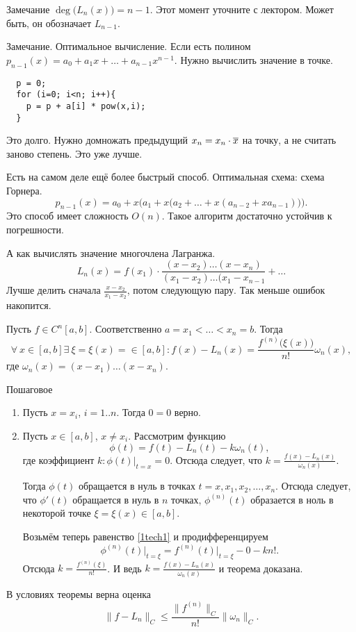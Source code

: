 Замечание $\deg \big(L_n(x)\big) = n-1$. Этот момент уточните с лектором. Может быть, он обозначает $L_{n-1}$.

Замечание. Оптимальное вычисление. Если есть полином $p_{n-1}(x) = a_0 + a_1 x+ \dots + a_{n-1} x^{n-1}$. Нужно вычислить значение в точке.
\begin{verbatim}
  p = 0;
  for (i=0; i<n; i++){
    p = p + a[i] * pow(x,i);
  }
\end{verbatim}
Это долго. Нужно домножать предыдущий $x_n = x_n\cdot \overline{x}$ на точку, а не считать заново степень. Это уже лучше.

Есть на самом деле ещё более быстрый способ. Оптимальная схема: схема Горнера.
\[
  p_{n-1}(x) = a_0 + x\Big(a_1 + x\big(a_2 + \dots + x(a_{n-2} + x a_{n-1})\big)\Big).
\]
Это способ имеет сложность $O(n)$.
Такое алгоритм достаточно устойчив к погрешности.

А как вычислять значение многочлена Лагранжа.
\[
  L_n(x) = f(x_1) \cdot \frac{ (x-x_2)\dots (x-x_n)}{(x_1-x_2)\dots(x_1-x_{n-1}}+\dots
\]
Лучше делить сначала $\frac{x-x_2}{x_1-x_2}$, потом следующую пару. Так меньше ошибок накопится.

\begin{The}
  Пусть $f\in C^n[a,b]$. Соответственно $a=x_1<\dots<x_n=b$. Тогда
\[
  \forall\ x\in[a,b]\exists\ \xi = \xi(x) = \in[a,b]\colon 
  f(x) - L_n(x) = \frac{f^{(n)}\big(\xi(x)\big)}{n!}\omega_n(x),
\]
где $\omega_n(x) = (x - x_1)\dots (x-x_n)$.
\end{The}
\begin{Proof}
 Пошаговое
\begin{enumerate}
\item Пусть $x=x_i$, $i=1..n$. Тогда $0=0$ верно.
\item Пусть $x\in [a,b]$, $x\ne x_i$. Рассмотрим функцию
\begin{equation}\label{1tech1}
  \phi(t) = f(t) - L_n(t) - k\omega_n(t),
\end{equation}
где коэффициент $k\colon \phi(t)\big|_{t=x}=0$. Отсюда следует, что $k = \frac{f(x) - L_n(x)}{\omega_n(x)}$.

Тогда $\phi(t)$ обращается в нуль в точках $t=x,x_1,x_2,\dots,x_n$. Отсюда следует, что $\phi'(t)$ обращается в нуль в $n$ точках, $\phi^{(n)}(t)$ образается в ноль в некоторой точке $\xi = \xi(x)\in[a,b]$.

Возьмём теперь равенство \eqref{1tech1} и продифференцируем
\[
  \phi^{(n)}(t)\big|_{t=\xi} = f^{(n)}(t)\big|_{t=\xi} - 0 - k n!.
\]
Отсюда $k=\frac{f^{(n)}(\xi)}{n!}$. И ведь $k = \frac{f(x)-L_n(x)}{\omega_n(x)}$ и теорема доказана.
\end{enumerate}
\end{Proof}
\begin{Sl}
В условиях теоремы верна оценка
\[
  \|f-L_n\|_C\le \frac{\| f^{(n)}\|_C}{n!} \|\omega_n\|_C.
\]
\end{Sl}

